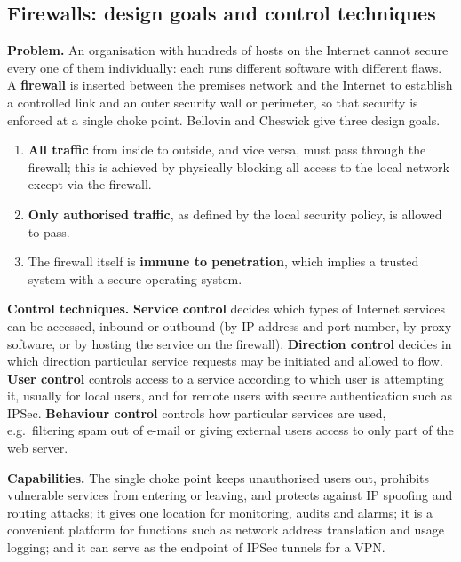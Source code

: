 \subsection{Firewalls: design goals and control techniques \hot\new}

\textbf{Problem.} An organisation with hundreds of hosts on the Internet cannot secure every one of them individually: each runs different software with different flaws. A \textbf{firewall} is inserted between the premises network and the Internet to establish a controlled link and an outer security wall or perimeter, so that security is enforced at a single choke point. Bellovin and Cheswick give three design goals.
\begin{enumerate}
  \item \textbf{All traffic} from inside to outside, and vice versa, must pass through the firewall; this is achieved by physically blocking all access to the local network except via the firewall.
  \item \textbf{Only authorised traffic}, as defined by the local security policy, is allowed to pass.
  \item The firewall itself is \textbf{immune to penetration}, which implies a trusted system with a secure operating system.
\end{enumerate}
\textbf{Control techniques.} \textbf{Service control} decides which types of Internet services can be accessed, inbound or outbound (by IP address and port number, by proxy software, or by hosting the service on the firewall). \textbf{Direction control} decides in which direction particular service requests may be initiated and allowed to flow. \textbf{User control} controls access to a service according to which user is attempting it, usually for local users, and for remote users with secure authentication such as IPSec. \textbf{Behaviour control} controls how particular services are used, e.g.\ filtering spam out of e-mail or giving external users access to only part of the web server.

\textbf{Capabilities.} The single choke point keeps unauthorised users out, prohibits vulnerable services from entering or leaving, and protects against IP spoofing and routing attacks; it gives one location for monitoring, audits and alarms; it is a convenient platform for functions such as network address translation and usage logging; and it can serve as the endpoint of IPSec tunnels for a VPN.

